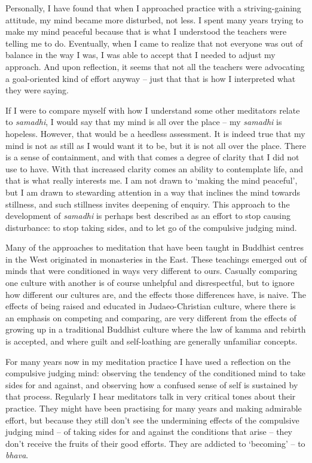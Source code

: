 Personally, I have found that when I approached practice with a
striving-gaining attitude, my mind became more disturbed, not less. I
spent many years trying to make my mind peaceful because that is what I
understood the teachers were telling me to do. Eventually, when I came
to realize that not everyone was out of balance in the way I was, I was
able to accept that I needed to adjust my approach. And upon reflection,
it seems that not all the teachers were advocating a goal-oriented kind
of effort anyway -- just that that is how I interpreted what they were
saying.

If I were to compare myself with how I understand some other meditators
relate to \emph{samadhi}, I would say that my mind is all over the place -- my
\emph{samadhi} is hopeless. However, that would be a heedless assessment. It
is indeed true that my mind is not as still as I would want it to be,
but it is not all over the place. There is a sense of containment, and
with that comes a degree of clarity that I did not use to have. With
that increased clarity comes an ability to contemplate life, and that is
what really interests me. I am not drawn to `making the mind peaceful',
but I am drawn to stewarding attention in a way that inclines the mind
towards stillness, and such stillness invites deepening of enquiry. This
approach to the development of \emph{samadhi} is perhaps best described as an
effort to stop causing disturbance: to stop taking sides, and to let go
of the compulsive judging mind.

Many of the approaches to meditation that have been taught in Buddhist
centres in the West originated in monasteries in the East. These
teachings emerged out of minds that were conditioned in ways very
different to ours. Casually comparing one culture with another is of
course unhelpful and disrespectful, but to ignore how different our
cultures are, and the effects those differences have, is naive. The
effects of being raised and educated in Judaeo-Christian culture, where
there is an emphasis on competing and comparing, are very different from
the effects of growing up in a traditional Buddhist culture where the
law of kamma and rebirth is accepted, and where guilt and self-loathing
are generally unfamiliar concepts.

For many years now in my meditation practice I have used a reflection on
the compulsive judging mind: observing the tendency of the conditioned
mind to take sides for and against, and observing how a confused sense
of self is sustained by that process. Regularly I hear meditators talk
in very critical tones about their practice. They might have been
practising for many years and making admirable effort, but because they
still don't see the undermining effects of the compulsive judging mind --
of taking sides for and against the conditions that arise -- they don't
receive the fruits of their good efforts. They are addicted to
`becoming' -- to \emph{bhava}.

